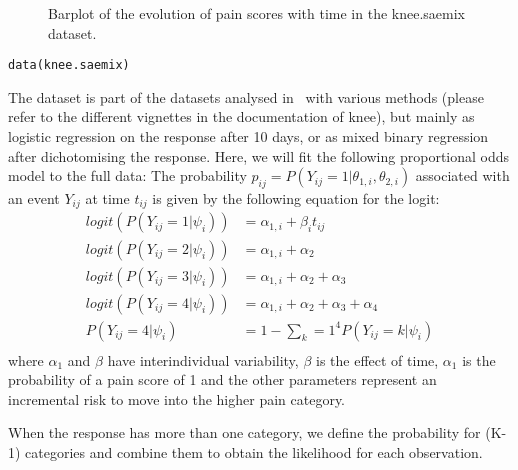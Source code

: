 \begin{figure}[!h]
\begin{center}
\end{center}
\par \kern -0.5cm
\caption{Barplot of the evolution of pain scores with time in the {\sf knee.saemix} dataset.} \label{fig:kneeData}
\end{figure}

\begin{verbatim}
data(knee.saemix)
\end{verbatim}

The dataset is part of the datasets analysed in~\cite{Tutz12} with various methods (please refer to the different vignettes in the documentation of {\sf knee}), but mainly as logistic regression on the response after 10 days, or as mixed binary regression after dichotomising the response. Here, we will fit the following proportional odds model to the full data:
The probability $p_{ij}=P(Y_{ij}=1 | \theta_{1,i}, \theta_{2,i})$ associated with an event $Y_{ij}$ at time $t_{ij}$ is given by the following equation for the logit:
\begin{equation}
\begin{split}
logit(P(Y_{ij} = 1 | \psi_i)) &= \alpha_{1,i} + \beta_{i} t_{ij} \\
logit(P(Y_{ij} = 2 | \psi_i)) &= \alpha_{1,i} + \alpha_2 \\
logit(P(Y_{ij} = 3 | \psi_i)) &= \alpha_{1,i} + \alpha_2 + \alpha_3 \\
logit(P(Y_{ij} = 4 | \psi_i)) &= \alpha_{1,i} + \alpha_2 + \alpha_3 +\alpha_4\\
P(Y_{ij} = 4 | \psi_i) &= 1 - \sum_k=1^4 P(Y_{ij} = k | \psi_i)\\
\end{split}
\end{equation}
where $\alpha_1$ and $\beta$ have interindividual variability, $\beta$ is the effect of time, $\alpha_1$ is the probability of a pain score of 1 and the other parameters represent an incremental risk to move into the higher pain category.

When the response has more than one category, we define the probability for (K-1) categories and combine them to obtain the likelihood for each observation.

